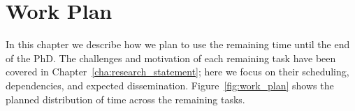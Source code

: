 
%

\chapter{Work Plan}
\label{cha:work_plan}


In this chapter we describe how we plan to use the remaining time until the end of the PhD.
The challenges and motivation of each remaining task have been covered in Chapter~\ref{cha:research_statement}; here we focus on their scheduling, dependencies, and expected dissemination.
Figure~\ref{fig:work_plan} shows the planned distribution of time across the remaining tasks.


